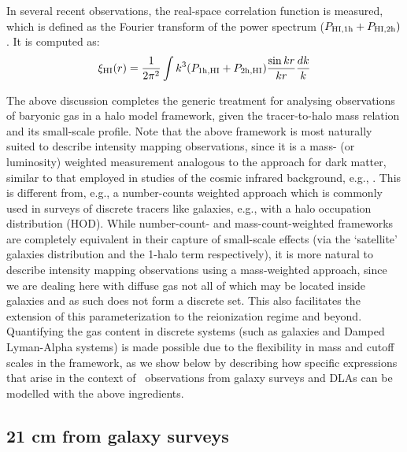 In several recent observations, the real-space correlation function is measured, which is defined as the Fourier transform of the power spectrum ($P_{\rm HI, 1h} + P_{\rm HI, 2h})$. It is computed as:
\begin{equation}
\xi_{\rm HI} (r) = \frac{1}{2 \pi ^2} \int k^3 (P_{\rm 1h, HI} + P_{\rm 2h, HI}) \frac{\sin kr}{kr} \frac{dk}{k}
\end{equation}

The above discussion completes the generic treatment for analysing observations of baryonic gas in a halo model framework, given the tracer-to-halo mass relation and its small-scale profile. Note that the above framework is most naturally suited to describe intensity mapping observations, since it is a mass- (or luminosity) weighted measurement analogous to the approach for dark matter, similar to that employed in studies of the cosmic infrared background, e.g., \cite{fernandez2006}. This is different from, e.g., a number-counts weighted approach which is commonly used in surveys of discrete tracers like galaxies, e.g., \cite{cooraysheth2002} with a halo occupation distribution (HOD). While number-count- and mass-count-weighted frameworks are completely equivalent in their capture of small-scale effects (via the `satellite' galaxies distribution and the 1-halo term respectively), it is more natural to describe intensity mapping observations using a mass-weighted approach, since we are dealing here with diffuse gas not all of which may be located inside galaxies and as such does not form a discrete set. This also facilitates the extension of this parameterization to the reionization regime and beyond. Quantifying the gas content in discrete systems (such as galaxies and Damped Lyman-Alpha systems) is made possible due to the flexibility in mass and cutoff scales in the framework, as we show below by describing how specific expressions that arise in the context of \HI\ observations from galaxy surveys and DLAs can be modelled with the above ingredients.



\subsection{21 cm from galaxy surveys}
\label{sec:21cmgal}

